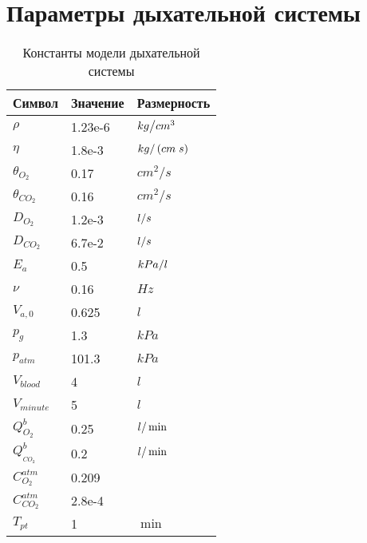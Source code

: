 \appendix
\chapter{Параметры дыхательной системы} 
\begin{table}[!ht]
    \centering
    \begin{tabular}{|p{1.5in}|p{1.5in}|p{1.5in}|}
    \hline 
    \textbf{Символ} & \textbf{Значение} & \textbf{Размерность} \\ \hline 
    $\rho $ & 1.23e-6 & ${kg\mathord{\left/ {\vphantom {kg cm^{3} }} \right. \kern-\nulldelimiterspace} cm^{3} } $ \\ \hline 
    $\eta $ & 1.8e-3 & ${kg\mathord{\left/ {\vphantom {kg \left(cm\; s\right)}} \right. \kern-\nulldelimiterspace} \left(cm\; s\right)} $ \\ \hline 
    $\theta _{O_{2} } $ & 0.17 & $cm^{2} /s$ \\ \hline 
    $\theta _{CO_{2} } $ & 0.16 & $cm^{2} /s$ \\ \hline 
    $D_{O_{2} } $ & 1.2e-3 & ${l\mathord{\left/ {\vphantom {l s}} \right. \kern-\nulldelimiterspace} s} $ \\ \hline 
    $D_{CO_{2} } $ & 6.7e-2 & ${l\mathord{\left/ {\vphantom {l s}} \right. \kern-\nulldelimiterspace} s} $ \\ \hline 
    $E_{a} $ & 0.5 & ${kPa\mathord{\left/ {\vphantom {kPa l}} \right. \kern-\nulldelimiterspace} l} $ \\ \hline 
    $\nu $\textit{} & 0.16 & $Hz$ \\ \hline 
    $V_{a,0} $\textit{} & 0.625 & $l$ \\ \hline 
    $p_{g} $ & 1.3 & $kPa$ \\ \hline 
    $p_{atm} $ & 101.3 & $kPa$ \\ \hline 
    $V_{blood} $ & 4 & $l$ \\ \hline 
    $V_{minute} $ & 5 & $l$ \\ \hline 
    $Q_{O_{2} }^{b} $ & 0.25 & ${l\mathord{\left/ {\vphantom {l \min }} \right. \kern-\nulldelimiterspace} \min } $ \\ \hline 
    $Q_{_{CO_{2} } }^{b} $ & 0.2 & ${l\mathord{\left/ {\vphantom {l \min }} \right. \kern-\nulldelimiterspace} \min } $ \\ \hline 
    $C_{O_{2} }^{atm} $ & 0.209 &  \\ \hline 
    $C_{CO_{2} }^{atm} $ & 2.8e-4 &  \\ \hline 
    $T_{pt} $ & 1 & $\min $ \\ \hline 
    \end{tabular}
    \caption{Константы модели дыхательной системы}
    \label{tab:langPuram}
\end{table}


